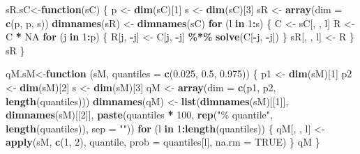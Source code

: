 \documentclass[12pt]{article}
\newenvironment{Shaded}{\begin{snugshade}}{\end{snugshade}}
\newcommand{\AttributeTok}[1]{\textcolor[rgb]{0.13,0.29,0.53}{#1}}
\newcommand{\ConstantTok}[1]{\textcolor[rgb]{0.56,0.35,0.01}{#1}}
\newcommand{\ControlFlowTok}[1]{\textcolor[rgb]{0.13,0.29,0.53}{\textbf{#1}}}
\newcommand{\DecValTok}[1]{\textcolor[rgb]{0.00,0.00,0.81}{#1}}
\newcommand{\FloatTok}[1]{\textcolor[rgb]{0.00,0.00,0.81}{#1}}
\newcommand{\FunctionTok}[1]{\textcolor[rgb]{0.13,0.29,0.53}{\textbf{#1}}}
\newcommand{\NormalTok}[1]{#1}
\newcommand{\OtherTok}[1]{\textcolor[rgb]{0.56,0.35,0.01}{#1}}
\newcommand{\SpecialCharTok}[1]{\textcolor[rgb]{0.81,0.36,0.00}{\textbf{#1}}}
\newcommand{\StringTok}[1]{\textcolor[rgb]{0.31,0.60,0.02}{#1}}
\begin{document}
\begin{Shaded}
\begin{Highlighting}[]
\NormalTok{sR.sC}\OtherTok{\textless{}{-}}\ControlFlowTok{function}\NormalTok{(sC) }
\NormalTok{\{}
\NormalTok{    p }\OtherTok{\textless{}{-}} \FunctionTok{dim}\NormalTok{(sC)[}\DecValTok{1}\NormalTok{]}
\NormalTok{    s }\OtherTok{\textless{}{-}} \FunctionTok{dim}\NormalTok{(sC)[}\DecValTok{3}\NormalTok{]}
\NormalTok{    sR }\OtherTok{\textless{}{-}} \FunctionTok{array}\NormalTok{(}\AttributeTok{dim =} \FunctionTok{c}\NormalTok{(p, p, s))}
    \FunctionTok{dimnames}\NormalTok{(sR) }\OtherTok{\textless{}{-}} \FunctionTok{dimnames}\NormalTok{(sC)}
    \ControlFlowTok{for}\NormalTok{ (l }\ControlFlowTok{in} \DecValTok{1}\SpecialCharTok{:}\NormalTok{s) \{}
\NormalTok{        C }\OtherTok{\textless{}{-}}\NormalTok{ sC[, , l]}
\NormalTok{        R }\OtherTok{\textless{}{-}}\NormalTok{ C }\SpecialCharTok{*} \ConstantTok{NA}
        \ControlFlowTok{for}\NormalTok{ (j }\ControlFlowTok{in} \DecValTok{1}\SpecialCharTok{:}\NormalTok{p) \{}
\NormalTok{            R[j, }\SpecialCharTok{{-}}\NormalTok{j] }\OtherTok{\textless{}{-}}\NormalTok{ C[j, }\SpecialCharTok{{-}}\NormalTok{j] }\SpecialCharTok{\%*\%} \FunctionTok{solve}\NormalTok{(C[}\SpecialCharTok{{-}}\NormalTok{j, }\SpecialCharTok{{-}}\NormalTok{j])}
\NormalTok{        \}}
\NormalTok{        sR[, , l] }\OtherTok{\textless{}{-}}\NormalTok{ R}
\NormalTok{    \}}
\NormalTok{    sR}
\NormalTok{\}}

\NormalTok{qM.sM}\OtherTok{\textless{}{-}}\ControlFlowTok{function}\NormalTok{ (sM, }\AttributeTok{quantiles =} \FunctionTok{c}\NormalTok{(}\FloatTok{0.025}\NormalTok{, }\FloatTok{0.5}\NormalTok{, }\FloatTok{0.975}\NormalTok{)) }
\NormalTok{\{}
\NormalTok{    p1 }\OtherTok{\textless{}{-}} \FunctionTok{dim}\NormalTok{(sM)[}\DecValTok{1}\NormalTok{]}
\NormalTok{    p2 }\OtherTok{\textless{}{-}} \FunctionTok{dim}\NormalTok{(sM)[}\DecValTok{2}\NormalTok{]}
\NormalTok{    s }\OtherTok{\textless{}{-}} \FunctionTok{dim}\NormalTok{(sM)[}\DecValTok{3}\NormalTok{]}
\NormalTok{    qM }\OtherTok{\textless{}{-}} \FunctionTok{array}\NormalTok{(}\AttributeTok{dim =} \FunctionTok{c}\NormalTok{(p1, p2, }\FunctionTok{length}\NormalTok{(quantiles)))}
    \FunctionTok{dimnames}\NormalTok{(qM) }\OtherTok{\textless{}{-}} \FunctionTok{list}\NormalTok{(}\FunctionTok{dimnames}\NormalTok{(sM)[[}\DecValTok{1}\NormalTok{]], }\FunctionTok{dimnames}\NormalTok{(sM)[[}\DecValTok{2}\NormalTok{]], }
        \FunctionTok{paste}\NormalTok{(quantiles }\SpecialCharTok{*} \DecValTok{100}\NormalTok{, }\FunctionTok{rep}\NormalTok{(}\StringTok{"\% quantile"}\NormalTok{, }\FunctionTok{length}\NormalTok{(quantiles)), }
            \AttributeTok{sep =} \StringTok{""}\NormalTok{))}
    \ControlFlowTok{for}\NormalTok{ (l }\ControlFlowTok{in} \DecValTok{1}\SpecialCharTok{:}\FunctionTok{length}\NormalTok{(quantiles)) \{}
\NormalTok{        qM[, , l] }\OtherTok{\textless{}{-}} \FunctionTok{apply}\NormalTok{(sM, }\FunctionTok{c}\NormalTok{(}\DecValTok{1}\NormalTok{, }\DecValTok{2}\NormalTok{), quantile, }\AttributeTok{prob =}\NormalTok{ quantiles[l], }
            \AttributeTok{na.rm =} \ConstantTok{TRUE}\NormalTok{)}
\NormalTok{    \}}
\NormalTok{    qM}
\NormalTok{\}}





\end{Highlighting}
\end{Shaded}
\end{document}
